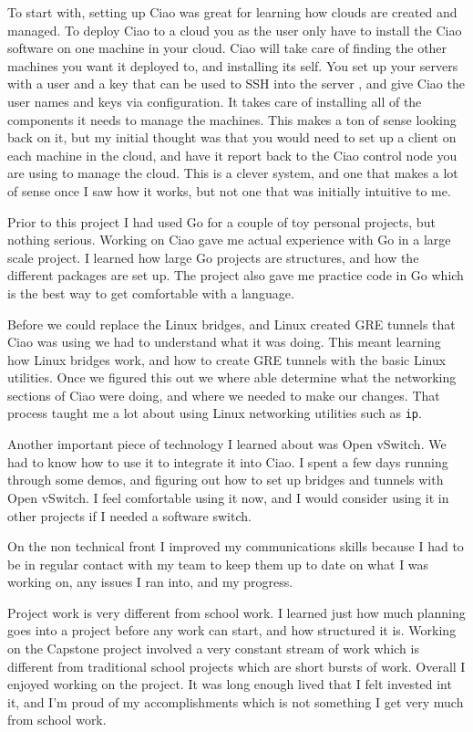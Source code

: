 \documentclass[10pt,onecolumn,journal,draftclsnofoot]{IEEEtran}
\begin{document}
To start with, setting up Ciao was great for learning how clouds are created and managed.
To deploy Ciao to a cloud you as the user only have to install the Ciao software on one machine in your cloud. Ciao will take care of finding the other machines you want it deployed to, and installing its self. 
You set up your servers with a user and a key that can be used to SSH into the server
, and give Ciao the user names and keys via configuration.
It takes care of installing all of the components it needs to manage the machines.
This makes a ton of sense looking back on it, but
my initial thought was that you would need to set up a client on each machine in the cloud, and have it report back to the Ciao control node you are using to manage the cloud.
This is a clever system, and one that makes a lot of sense once I saw how it works, but not one that was initially intuitive to me.


Prior to this project I had used Go for a couple of toy personal projects, but nothing serious.
Working on Ciao gave me actual experience with Go in a large scale project. I learned how large Go projects are structures, and how the different packages are set up.
The project also gave me practice code in Go which is the best way to get comfortable with a language.

Before we could replace the Linux bridges, and Linux created GRE tunnels that Ciao was using we had to understand what it was doing. This meant learning how Linux bridges work, and how to create GRE tunnels with the basic Linux utilities. Once we figured this out we where able determine what the networking sections of Ciao were doing, and where we needed to make our changes. That process taught me a lot about using Linux networking utilities such as \texttt{ip}.

Another important piece of technology I learned about was Open vSwitch. We had to know how to use it to integrate it into Ciao. I spent a few days running through some demos, and figuring out how to set up bridges and tunnels with Open vSwitch. I feel comfortable using it now, and I would consider using it in other projects if I needed a software switch.

On the non technical front I improved my communications skills because I had to be in regular contact with my team to keep them up to date on what I was working on, any issues I ran into, and my progress.

Project work is very different from school work. I learned just how much planning goes into a project before any work can start, and how structured it is. Working on the Capstone project involved a very constant stream of work which is different from traditional school projects which are short bursts of work. Overall I enjoyed working on the project. It was long enough lived that I felt invested int it, and I'm proud of my accomplishments which is not something I get very much from school work.
\end{document}

